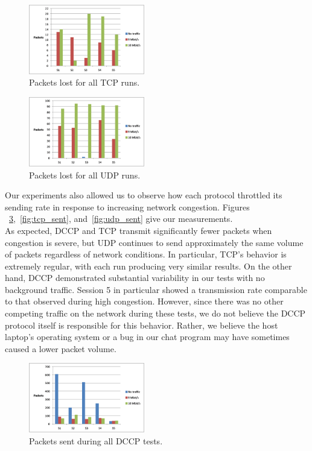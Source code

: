\documentclass[9pt,twocolumn]{article}
\begin{document}
\begin{figure}[h]
   \centering
      \includegraphics[width=0.45\textwidth]{pics/tcp_losses}
   \caption{Packets lost for all TCP runs.}
\label{fig:tcp_losses}
\end{figure}

\begin{figure}[h]
   \centering
      \includegraphics[width=0.45\textwidth]{pics/udp_losses}
   \caption{Packets lost for all UDP runs.}
\label{fig:udp_losses}
\end{figure}

Our experiments also allowed us to observe how each protocol throttled its
sending rate in response to increasing network congestion. Figures
~\ref{fig:dccp_sent},~\ref{fig:tcp_sent}, and~\ref{fig:udp_sent} give our
measurements.\\

As expected, DCCP and TCP transmit significantly fewer packets when congestion
is severe, but UDP continues to send approximately the same volume of packets
regardless of network conditions. In particular, TCP's behavior is extremely
regular, with each run producing very similar results. On the other hand, DCCP
demonstrated substantial variability in our tests with no background traffic.
Session 5 in particular showed a transmission rate comparable to that observed
during high congestion. However, since there was no other competing traffic on
the network during these tests, we do not believe the DCCP protocol itself is
responsible for this behavior. Rather, we believe the host laptop's operating
system or a bug in our chat program may have sometimes caused a lower packet
volume.

\begin{figure}[h]
   \centering
      \includegraphics[width=0.45\textwidth]{pics/dccp_sent}
   \caption{Packets sent during all DCCP tests.}
\label{fig:dccp_sent}
\end{figure}
\end{document}
